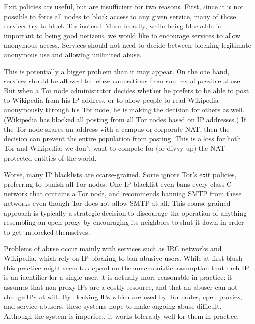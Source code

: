 \documentclass{llncs}
\begin{document}
Exit policies are useful, but are insufficient for two reasons.  First, since
it is not possible to force all nodes to block access to any given service,
many of those services try to block Tor instead.  More broadly, while being
blockable is important to being good netizens, we would like to encourage
services to allow anonymous access. Services should not need to decide
between blocking legitimate anonymous use and allowing unlimited abuse.

This is potentially a bigger problem than it may appear.
On the one hand, services should be allowed to refuse connections from
sources of possible abuse.
But when a Tor node administrator decides whether he prefers to be able
to post to Wikipedia from his IP address, or to allow people to read
Wikipedia anonymously through his Tor node, he is making the decision
for others as well. (Wikipedia
has blocked all posting from all Tor nodes based on IP addresses.) If
the Tor node shares an address with a campus or corporate NAT,
then the decision can prevent the entire population from posting.
This is a loss for both Tor
and Wikipedia: we don't want to compete for (or divvy up) the
NAT-protected entities of the world.

Worse, many IP blacklists are coarse-grained. Some
ignore Tor's exit policies, preferring to punish
all Tor nodes. One IP blacklist even bans
every class C network that contains a Tor node, and recommends banning SMTP
from these networks even though Tor does not allow SMTP at all.  This
coarse-grained approach is typically a strategic decision to discourage the
operation of anything resembling an open proxy by encouraging its neighbors
to shut it down in order to get unblocked themselves.

Problems of abuse occur mainly with services such as IRC networks and
Wikipedia, which rely on IP blocking to ban abusive users.  While at first
blush this practice might seem to depend on the anachronistic assumption that
each IP is an identifier for a single user, it is actually more reasonable in
practice: it assumes that non-proxy IPs are a costly resource, and that an
abuser can not change IPs at will.  By blocking IPs which are used by Tor
nodes, open proxies, and service abusers, these systems hope to make
ongoing abuse difficult.  Although the system is imperfect, it works
tolerably well for them in practice.
\end{document}
